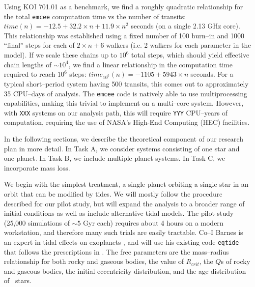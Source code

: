 Using KOI 701.01 as a benchmark, we find a roughly quadratic
relationship for the total {\tt emcee} computation time vs the number
of transits: $time(n) = -12.5 + 32.2 \times n + 11.9 \times n^2$
seconds (on a single 2.13 GHz core).  This relationship was
established using a fixed number of 100 burn--in and 1000 ``final''
steps for each of $2 \times n + 6$ walkers (i.e. 2 walkers for each
parameter in the model).  If we scale these chains up to $10^6$ total
steps, which should yield effective chain lengths of $\sim 10^4$, we
find a linear relationship in the computation time required to reach
$10^6$ steps: $time_{10^6}(n) = -1105 + 5943 \times n$ seconds.  For a
typical short--period system having 500 transits, this comes out to
approximately 35 CPU--days of analysis.  The {\tt emcee} code is
natively able to use multiprocessing capabilities, making this trivial
to implement on a multi--core system.  However, with {\tt XXX} systems
on our analysis path, this will require {\tt YYY} CPU--years of
computation, requiring the use of NASA's High-End Computing (HEC)
facilities.  


In the following sections, we describe the theoretical component of
our research plan in more detail.  In Task A, we consider systems
consisting of one star and one planet.  In Task B, we include multiple
planet systems. In Task C, we incorporate mass loss.

\medskip
{\centerline{}}
\smallskip

We begin with the simplest treatment, a single planet orbiting a
single star in an orbit that can be modified by tides.  We will mostly
follow the procedure described for our pilot study, but will expand
the analysis to a broader range of initial conditions as well as
include alternative tidal models.  The pilot study (25,000 simulations
of $\sim 5$ Gyr each) requires about 4 hours on a modern workstation,
and therefore many such trials are easily tractable.  Co--I Barnes is
an expert in tidal effects on exoplanets
\cite{Barnes08,Jackson08,Barnes09,Barnes12}, and will use his
existing code \texttt{eqtide} that follows the prescriptions in
\cite{Barnes12}.  The free parameters are the mass--radius
relationship for both rocky and gaseous bodies, the value of
$R_{crit}$, the $Q$s of rocky and gaseous bodies, the initial
eccentricity distribution, and the age distribution of \kepler~stars.

